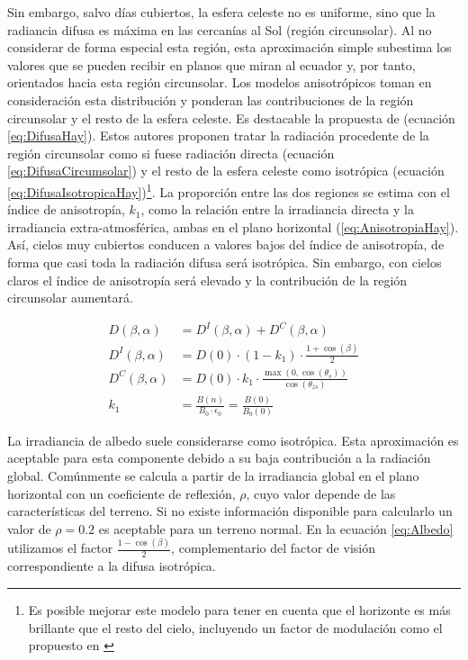 Sin embargo, salvo días cubiertos, la esfera celeste no es uniforme,
sino que la radiancia difusa es máxima en las cercanías al Sol (región
circunsolar). Al no considerar de forma especial esta región, esta
aproximación simple subestima los valores que se pueden recibir en
planos que miran al ecuador y, por tanto, orientados hacia esta región
circunsolar. Los modelos anisotrópicos toman en consideración esta
distribución y ponderan las contribuciones de la región circunsolar y
el resto de la esfera celeste. Es destacable la propuesta de
\cite{Hay.McKay1985} (ecuación \ref{eq:DifusaHay}). Estos autores
proponen tratar la radiación procedente de la región circunsolar como
si fuese radiación directa (ecuación \ref{eq:DifusaCircumsolar}) y el
resto de la esfera celeste como isotrópica (ecuación
\ref{eq:DifusaIsotropicaHay})\footnote{Es posible mejorar este modelo
  para tener en cuenta que el horizonte es más brillante que el resto
  del cielo, incluyendo un factor de modulación como el propuesto en
  \cite{Reindl.Beckman.ea1990}}.  La proporción entre las dos
regiones se estima con el índice de anisotropía, $k_{1}$, como la
relación entre la irradiancia directa y la irradiancia
extra-atmosférica, ambas en el plano horizontal
(\ref{eq:AnisotropiaHay}).  Así, cielos muy cubiertos conducen a valores bajos
del índice de anisotropía, de forma que casi toda la radiación difusa
será isotrópica. Sin embargo, con cielos claros el índice de
anisotropía será elevado y la contribución de la región circunsolar
aumentará.

\begin{align}
  D(\beta,\alpha) & =D^{I}(\beta,\alpha)+D^{C}(\beta,\alpha)\label{eq:DifusaHay}\\
  D^{I}(\beta,\alpha) & =D(0)\cdot(1-k_{1})\cdot\frac{1+\cos(\beta)}{2}\label{eq:DifusaIsotropicaHay}\\
  D^{C}(\beta,\alpha) & =D(0)\cdot k_{1}\cdot\frac{\max(0,\cos(\theta_{s}))}{\cos(\theta_{zs})}\label{eq:DifusaCircumsolar}\\
  k_{1} & =\frac{B(n)}{B_{0}\cdot\epsilon_0} = \frac{B(0)}{B_{0}(0)}\label{eq:AnisotropiaHay}
\end{align}

La irradiancia de albedo suele considerarse como isotrópica. Esta
aproximación es aceptable para esta componente debido a su baja
contribución a la radiación global. Comúnmente se calcula a partir de
la irradiancia global en el plano horizontal con un coeficiente de
reflexión, $\rho$, cuyo valor depende de las características del
terreno. Si no existe información disponible para calcularlo un valor
de $\rho=0.2$ es aceptable para un terreno
normal. En la ecuación \ref{eq:Albedo} utilizamos el factor
$\frac{1-\cos(\beta)}{2}$, complementario del factor de visión
correspondiente a la difusa isotrópica.

